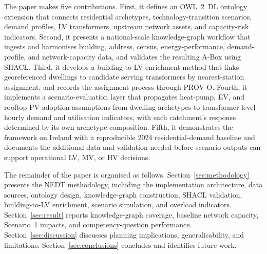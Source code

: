 \documentclass[preprint,12pt]{elsarticle}
\begin{document}
The paper makes five contributions.
First, it defines an OWL~2~DL ontology extension that connects residential
archetypes, technology-transition scenarios, demand profiles, LV
transformers, upstream network assets, and capacity-risk indicators.
Second, it presents a national-scale knowledge-graph workflow that ingests
and harmonises building, address, census, energy-performance,
demand-profile, and network-capacity data, and validates the resulting
A-Box using SHACL.
Third, it develops a building-to-LV enrichment method that links
georeferenced dwellings to candidate serving transformers by nearest-station
assignment, and records the assignment process through PROV-O.
Fourth, it implements a scenario-evaluation layer that propagates heat-pump,
EV, and rooftop PV adoption assumptions from dwelling archetypes to
transformer-level hourly demand and utilisation indicators, with each
catchment's response determined by its own archetype composition.
Fifth, it demonstrates the framework on Ireland with a reproducible 2024
residential-demand baseline and documents the additional data and validation
needed before scenario outputs can support operational LV, MV, or HV
decisions.

The remainder of the paper is organised as follows.
Section~\ref{sec:methodology} presents the NEDT methodology, including the
implementation architecture, data sources, ontology design, knowledge-graph
construction, SHACL validation, building-to-LV enrichment, scenario
simulation, and overload indicators.
Section~\ref{sec:result} reports knowledge-graph coverage, baseline network
capacity, Scenario~1 impacts, and competency-question performance.
Section~\ref{sec:discussion} discusses planning implications,
generalisability, and limitations.
Section~\ref{sec:conclusions} concludes and identifies future work.


\end{document}
